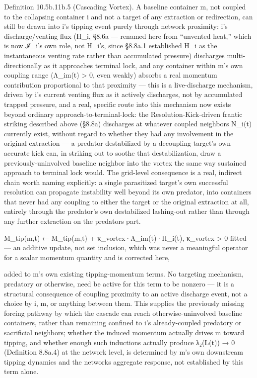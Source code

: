 \documentclass[
]{article}
\begin{document}
Definition 10.5b.11b.5 (Cascading Vortex). A baseline container m, not
coupled to the collapsing container i and not a target of any extraction
or redirection, can still be drawn into i's tipping event purely through
network proximity: i's discharge/venting flux (H\_i, §8.6a --- renamed
here from ``unvented heat,'' which is now ℐ\_i's own role, not H\_i's,
since §8.8a.1 established H\_i as the instantaneous venting rate rather
than accumulated pressure) discharges multi-directionally as it
approaches terminal lock, and any container within m's own coupling
range (Λ\_im(t) \textgreater{} 0, even weakly) absorbs a real momentum
contribution proportional to that proximity --- this is a live-discharge
mechanism, driven by i's current venting flux as it actively discharges,
not by accumulated trapped pressure, and a real, specific route into
this mechanism now exists beyond ordinary approach-to-terminal-lock: the
Resolution-Kick-driven frantic striking described above (§8.8a)
discharges at whatever coupled neighbors N\_i(t) currently exist,
without regard to whether they had any involvement in the original
extraction --- a predator destabilized by a decoupling target's own
accurate kick can, in striking out to soothe that destabilization, draw
a previously-uninvolved baseline neighbor into the vortex the same way
sustained approach to terminal lock would. The grid-level consequence is
a real, indirect chain worth naming explicitly: a single parasitized
target's own successful resolution can propagate instability well beyond
its own predator, into containers that never had any coupling to either
the target or the original extraction at all, entirely through the
predator's own destabilized lashing-out rather than through any further
extraction on the predators part.

M\_tip(m,t) ← M\_tip(m,t) + κ\_vortex·Λ\_im(t)·H\_i(t), κ\_vortex
\textgreater{} 0 fitted --- an additive update, not set inclusion, which
was never a meaningful operator for a scalar momentum quantity and is
corrected here,

added to m's own existing tipping-momentum terms. No targeting
mechanism, predatory or otherwise, need be active for this term to be
nonzero --- it is a structural consequence of coupling proximity to an
active discharge event, not a choice by i, m, or anything between them.
This supplies the previously missing forcing pathway by which the
cascade can reach otherwise-uninvolved baseline containers, rather than
remaining confined to i's already-coupled predatory or sacrificial
neighbors; whether the induced momentum actually drives m toward
tipping, and whether enough such inductions actually produce λ₂(L(t)) →
0 (Definition 8.8a.4) at the network level, is determined by m's own
downstream tipping dynamics and the networks aggregate response, not
established by this term alone.
\end{document}
